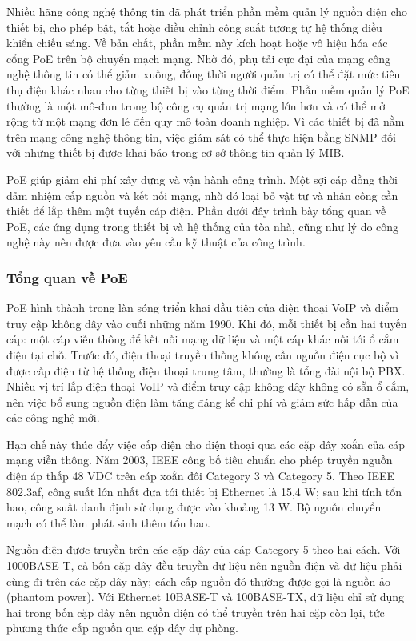 \documentclass{thesis}
\begin{document}
Nhiều hãng công nghệ thông tin đã phát triển phần mềm quản lý nguồn
điện cho thiết bị, cho phép bật, tắt hoặc điều chỉnh công suất tương
tự hệ thống điều khiển chiếu sáng. Về bản chất, phần mềm này kích
hoạt hoặc vô hiệu hóa các cổng PoE trên bộ chuyển mạch mạng. Nhờ đó,
phụ tải cực đại của mạng công nghệ thông tin có thể giảm xuống, đồng
thời người quản trị có thể đặt mức tiêu thụ điện khác nhau cho từng
thiết bị vào từng thời điểm. Phần mềm quản lý PoE thường là một
mô-đun trong bộ công cụ quản trị mạng lớn hơn và có thể mở rộng từ
một mạng đơn lẻ đến quy mô toàn doanh nghiệp. Vì các thiết bị đã nằm
trên mạng công nghệ thông tin, việc giám sát có thể thực hiện bằng
SNMP đối với những thiết bị được khai báo trong cơ sở thông tin quản lý MIB.

PoE giúp giảm chi phí xây dựng và vận hành công trình. Một sợi cáp
đồng thời đảm nhiệm cấp nguồn và kết nối mạng, nhờ đó loại bỏ vật tư
và nhân công cần thiết để lắp thêm một tuyến cáp điện. Phần dưới đây
trình bày tổng quan về PoE, các ứng dụng trong thiết bị và hệ thống
của tòa nhà, cũng như lý do công nghệ này nên được đưa vào yêu cầu kỹ
thuật của công trình.

\subsubsection{Tổng quan về PoE}

PoE hình thành trong làn sóng triển khai đầu tiên của điện thoại VoIP
và điểm truy cập không dây vào cuối những năm 1990. Khi đó, mỗi thiết
bị cần hai tuyến cáp: một cáp viễn thông để kết nối mạng dữ liệu và
một cáp khác nối tới ổ cắm điện tại chỗ. Trước đó, điện thoại truyền
thống không cần nguồn điện cục bộ vì được cấp điện từ hệ thống điện
thoại trung tâm, thường là tổng đài nội bộ PBX. Nhiều vị trí lắp điện
thoại VoIP và điểm truy cập không dây không có sẵn ổ cắm, nên việc bổ
sung nguồn điện làm tăng đáng kể chi phí và giảm sức hấp dẫn của các
công nghệ mới.

Hạn chế này thúc đẩy việc cấp điện cho điện thoại qua các cặp dây
xoắn của cáp mạng viễn thông. Năm 2003, IEEE công bố tiêu chuẩn cho
phép truyền nguồn điện áp thấp 48 VDC trên cáp xoắn đôi Category 3 và
Category 5. Theo IEEE 802.3af, công suất lớn nhất đưa tới thiết bị
Ethernet là 15,4 W; sau khi tính tổn hao, công suất danh định sử dụng
được vào khoảng 13 W. Bộ nguồn chuyển mạch có thể làm phát sinh thêm tổn hao.

Nguồn điện được truyền trên các cặp dây của cáp Category 5 theo hai
cách. Với 1000BASE-T, cả bốn cặp dây đều truyền dữ liệu nên nguồn
điện và dữ liệu phải cùng đi trên các cặp dây này; cách cấp nguồn đó
thường được gọi là nguồn ảo (phantom power). Với Ethernet 10BASE-T và
100BASE-TX, dữ liệu chỉ sử dụng hai trong bốn cặp dây nên nguồn điện
có thể truyền trên hai cặp còn lại, tức phương thức cấp nguồn qua cặp
dây dự phòng.
\end{document}
